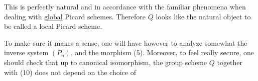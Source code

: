 This is perfectly natural and in accordance with the familiar phenomena when dealing with \uline{global} Picard schemes. Therefore $Q$ looks like the natural object to be called a  local Picard scheme.

To make sure it makes a sense, one will have however to analyze somewhat the inverse system $(P_n)$, and the morphism (5). Moreover, to feel really secure, one should check that up to canonical isomorphism, the group scheme $Q$ together with (10) does not depend on the choice of
